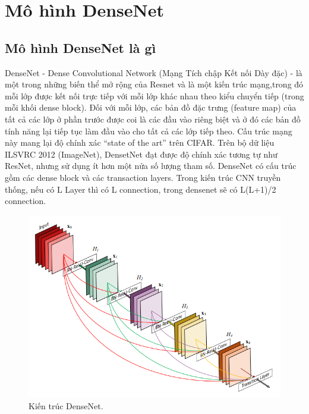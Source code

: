 \section{Mô hình DenseNet}
\subsection{Mô hình DenseNet là gì}
DenseNet - Dense Convolutional Network (Mạng Tích chập Kết nối Dày đặc) - là một trong những biến thể mở rộng của Resnet và là một kiến trúc mạng,trong đó mỗi lớp được kết nối trực tiếp với mỗi lớp khác nhau theo kiểu chuyển tiếp (trong mỗi khối dense block). Đối với mỗi lớp, các bản đồ đặc trưng (feature map) của tất cả các lớp ở phần trước được coi là các đầu vào riêng biệt và ở đó các bản đồ tính năng lại tiếp tục làm đầu vào cho tất cả các lớp tiếp theo. Cấu trúc mạng này mang lại độ chính xác “state of the art” trên CIFAR. Trên bộ dữ liệu ILSVRC 2012 (ImageNet), DensetNet đạt được độ chính xác tương tự như ResNet, nhưng sử dụng ít hơn một nửa số lượng tham số. DenseNet có cấu trúc gồm các dense block và các transaction layers. Trong kiến trúc CNN truyền thống, nếu có L Layer thì có L connection, trong densenet sẽ có L(L+1)/2 connection\cite{densenetlagi}.

\begin{figure}[H]
	\centering
	\includegraphics[width=0.8\linewidth]{images/densenet_hl}
	\caption{Kiến trúc DenseNet.}
	\label{fig:kien_truc_densenet}
\end{figure} 

